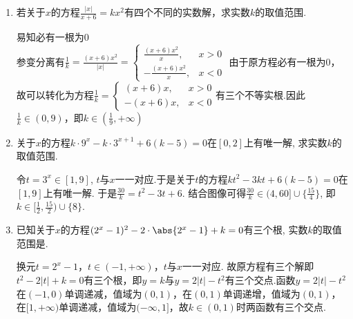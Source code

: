 \begin{enumerate}
\begin{enumerate}
\begin{jieda}
            首先考虑换元$t = x + \frac{1}{x}$，$f(x) = g(t) = t^2+k\cdot t + 9$，当$t = 2$时，只对应一个$x$，当$t > 2$时，对应着两个$x$. 故若$f(x)$在$(0, +\infty)$，有两个零点可以转化为$g(t)$在$(2, +\infty)$有一个零点，进一步转化为$y = -k$与$y = t + \frac{9}{t}$在$(2, +\infty)$有一个交点. 因此$k \in (-\infty, -\frac{13}{2}) \cup \{-6\}$ \\
            \ps \textbf{换元后及时判断新元的取值范围，并且分析清楚换元前后的对应关系！}
        \end{jieda}
        \item 若关于$x$的方程$\frac{|x|}{x+6} = kx^2$有四个不同的实数解，求实数$k$的取值范围.
        \begin{jieda}
            易知必有一根为0 \\
            参变分离有$\frac{1}{k} = \frac{(x+6)x^2}{|x|} = \left \{ \begin{array}{ll}
                \frac{(x+6)x^2}{x}, & x > 0 \\
                -\frac{(x+6)x^2}{x},  & x < 0
            \end{array}\right.$
            由于原方程必有一根为0，故可以转化为方程$\frac{1}{k} = \left \{ \begin{array}{ll}
                (x+6)x, & x > 0 \\
                -(x+6)x,  & x < 0
            \end{array}\right.$有三个不等实根.因此$\frac{1}{k} \in (0, 9)$，即$k \in (\frac{1}{9}, +\infty)$
        \end{jieda}
        \item 关于$x$的方程$k\cdot9^x-k\cdot3^{x+1}+6(k-5)=0$在$[0,2]$上有唯一解, 求实数$k$的取值范围. 
        \begin{jieda}
        令$t=3^x\in[1,9]$, $t$与$x$一一对应.于是关于$t$的方程$kt^2-3kt+6(k-5)=0$在$[1,9]$上有唯一解. 于是$\frac{30}{k}=t^2-3t+6$. 结合图像可得$\frac{30}{k}\in(4,60]\cup\{\frac{15}{4}\}$, 即$k\in[\frac{1}{2},\frac{15}{2})\cup\{8\}$. 
        \end{jieda}
        \item 已知关于$x$的方程$(2^x-1)^2-2\cdot\abs{2^x-1}+k=0$有三个根, 实数$k$的取值范围是. 
        \begin{jieda}
            换元$t = 2^x - 1$，$t \in (-1, +\infty)$，$t$与$x$一一对应. 故原方程有三个解即$t^2 - 2|t| + k = 0$有三个根，即$y = k$与$y = 2|t| - t^2$有三个交点.函数$y = 2|t| - t^2$在$(-1, 0)$单调递减，值域为$(0, 1)$，在$(0, 1)$单调递增，值域为$(0, 1)$，在$[1, +\infty)$单调递减，值域为$(-\infty, 1]$，故$k \in (0, 1)$时两函数有三个交点.

\end{jieda}
\end{enumerate}
\end{enumerate}
